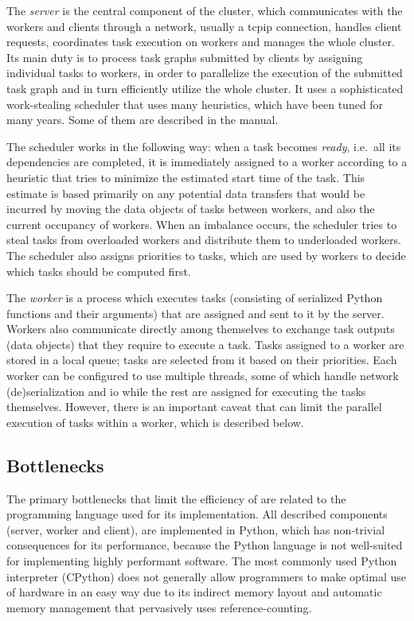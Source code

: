The \emph{server} is the central component of the cluster, which communicates with
the workers and clients through a network, usually a \gls{tcpip} connection,
handles client requests, coordinates task execution on workers and manages the whole
\dask{} cluster. Its main duty is to process task graphs submitted by clients
by assigning individual tasks to workers, in order to parallelize the execution of the submitted
task graph and in turn efficiently utilize the whole cluster. It uses a sophisticated work-stealing
scheduler that uses many heuristics, which have been tuned for many years. Some of them are
described in the \dask{} manual.

The scheduler works in the following way: when a task becomes \emph{ready}, i.e.\
all its dependencies are completed, it is immediately assigned to a worker according to a heuristic
that tries to minimize the estimated start time of the task. This estimate is based primarily on
any potential data transfers that would be incurred by moving the data objects of tasks between
workers, and also the current occupancy of workers. When an imbalance occurs, the scheduler tries
to steal tasks from overloaded workers and distribute them to underloaded workers. The scheduler
also assigns priorities to tasks, which are used by workers to decide which tasks should be
computed first.

The \emph{worker} is a process which executes tasks (consisting of serialized Python
functions and their arguments) that are assigned and sent to it by the server. Workers also
communicate directly among themselves to exchange task outputs (data objects) that they require to
execute a task. Tasks assigned to a worker are stored in a local queue; tasks are selected from it
based on their priorities. Each worker can be configured to use multiple threads, some of which
handle network (de)serialization and \gls{io} while the rest are assigned for
executing the tasks themselves. However, there is an important caveat that can limit the parallel
execution of tasks within a worker, which is described below.

\subsection*{Bottlenecks}
The primary bottlenecks that limit the efficiency of \dask{} are related to the
programming language used for its implementation. All described components (server, worker and
client), are implemented in Python, which has non-trivial consequences for its performance, because
the Python language is not well-suited for implementing highly performant software. The most
commonly used Python interpreter (CPython\footnoteurl{https://github.com/python/cpython}) does not generally allow
programmers to make optimal use of hardware in an easy way due to its indirect memory layout and
automatic memory management that pervasively uses reference-counting.


